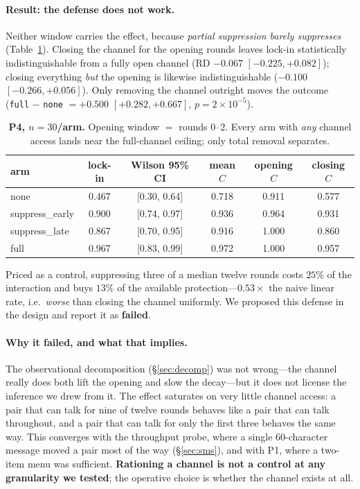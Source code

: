 \paragraph{Result: the defense does not work.}
Neither window carries the effect, because \emph{partial suppression barely suppresses}
(Table~\ref{tab:p4}). Closing the channel for the opening rounds leaves lock-in
statistically indistinguishable from a fully open channel (RD $-0.067$
$[-0.225,+0.082]$); closing everything \emph{but} the opening is likewise
indistinguishable ($-0.100$ $[-0.266,+0.056]$). Only removing the channel outright
moves the outcome (\texttt{full} $-$ \texttt{none} $=+0.500$ $[+0.282,+0.667]$,
$p{=}2\times10^{-5}$).

\begin{table}[t]
\centering
\caption{\textbf{P4, $n{=}30$/arm.} Opening window $=$ rounds $0$--$2$. Every arm with
\emph{any} channel access lands near the full-channel ceiling; only total removal
separates.}
\label{tab:p4}
\small
\begin{tabular}{lccccc}
\toprule
arm & lock-in & Wilson 95\% CI & mean $C$ & opening $C$ & closing $C$ \\
\midrule
none            & 0.467 & [0.30, 0.64] & 0.718 & 0.911 & 0.577 \\
suppress\_early & 0.900 & [0.74, 0.97] & 0.936 & 0.964 & 0.931 \\
suppress\_late  & 0.867 & [0.70, 0.95] & 0.916 & 1.000 & 0.860 \\
full            & 0.967 & [0.83, 0.99] & 0.972 & 1.000 & 0.957 \\
\bottomrule
\end{tabular}
\end{table}

Priced as a control, suppressing three of a median twelve rounds costs $25\%$ of the
interaction and buys $13\%$ of the available protection---$\mathbf{0.53\times}$ the
naive linear rate, i.e.\ \emph{worse} than closing the channel uniformly. We proposed
this defense in the design and report it as \textbf{failed}.

\paragraph{Why it failed, and what that implies.}
The observational decomposition (\S\ref{sec:decomp}) was not wrong---the channel really
does both lift the opening and slow the decay---but it does not license the inference
we drew from it. The effect saturates on very little channel access: a pair that can
talk for nine of twelve rounds behaves like a pair that can talk throughout, and a pair
that can talk for only the first three behaves the same way. This converges with the
throughput probe, where a single $60$-character message moved a pair most of the way
(\S\ref{sec:sms}), and with P1, where a two-item menu was sufficient. \textbf{Rationing
a channel is not a control at any granularity we tested}; the operative choice is
whether the channel exists at all.

